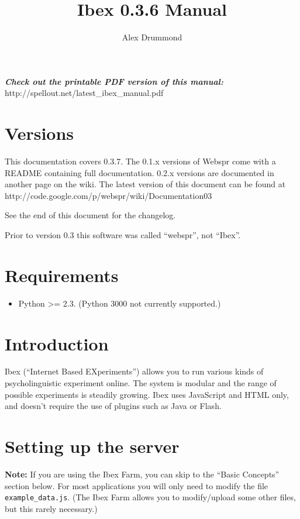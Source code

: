 \documentclass[11pt,letterpaper]{article}
\begin{document}
\date{}
\author{Alex Drummond}
\title{Ibex 0.3.6 Manual}

\maketitle

\tableofcontents

\textit{ }\textbf{\textit{Check out the printable PDF version of this manual:}}\textit{}  http://spellout.net/latest\_ibex\_manual.pdf

\section{Versions}

This documentation covers 0.3.7. The 0.1.x
versions of Webspr come with a README containing full documentation.
0.2.x versions are documented in another page on the wiki.
The latest version of this document can be found at
http://code.google.com/p/webspr/wiki/Documentation03

See the end of this document for the changelog.

Prior to version 0.3 this software was called ``webspr'',
not ``Ibex''.

\section{Requirements}

\begin{itemize}

\item
 Python >= 2.3. (Python 3000 not currently supported.)
\end{itemize}
\section{Introduction}

Ibex (``Internet Based EXperiments'') allows you to run various kinds of psycholinguistic experiment online.
The system
is modular and the range of possible experiments is steadily growing. Ibex
uses JavaScript and HTML only, and doesn't require the use of plugins such as
Java or Flash.

\section{Setting up the server}

\textbf{Note:} If you are using the Ibex Farm, you can skip to the ``Basic Concepts'' section
below. For most applications you will only need to modify the file \texttt{example\_data.js}.
(The Ibex Farm allows you to modify/upload some other files, but this rarely necessary.)
\end{document}
